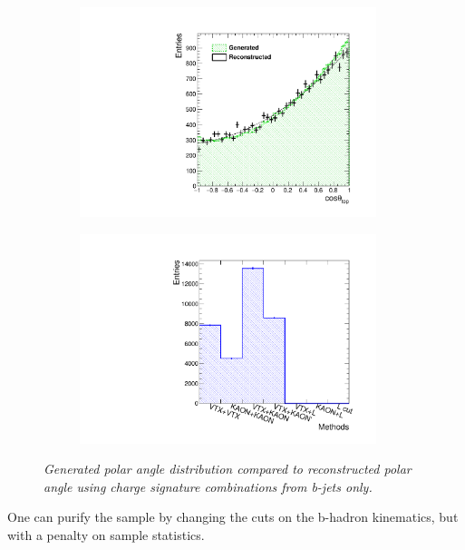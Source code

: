 \begin{figure}[h]
	\centering
	\begin{subfigure}{0.5\textwidth}
		\includegraphics[width=0.95\textwidth]{ILD/plots/top-asymmetry-bonly-nocut.pdf}
		\caption{\label{fig:TopAsymmetryNoCutBjet_a_3} }
	\end{subfigure}%
	\begin{subfigure}{0.5\textwidth}
		\centering
		\includegraphics[width=0.95\textwidth]{ILD/plots/top-methods-bonly.pdf}
		\caption{\label{fig:TopAsymmetryNoCutBjet_b_3} }
	\end{subfigure}
	\caption{\sl Generated polar angle distribution compared to reconstructed polar angle using charge signature combinations from b-jets only. }
	\label{fig:TopAsymmetryNoCutBjet_3}
\end{figure}

One can purify the sample by changing the cuts on the b-hadron kinematics, but with a penalty on sample statistics. 

